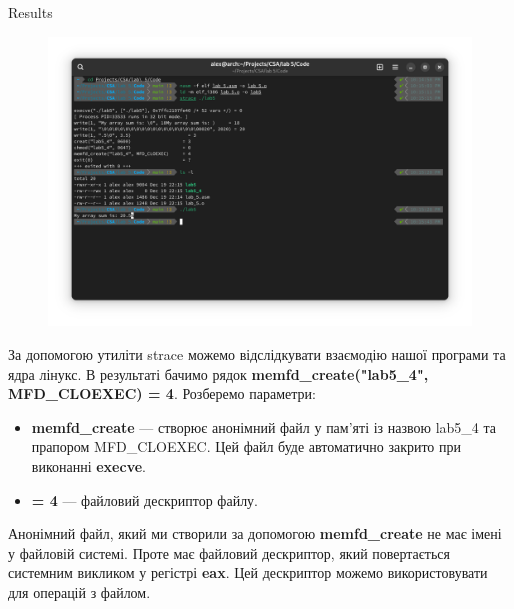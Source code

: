 \documentclass[a4paper,12pt]{article}
\begin{document}
    \begin{center}
        \Large{Results}
    \end{center}
    \begin{figure}[h!]
        \begin{minipage}[h]{1\linewidth}
            \centering
            \includegraphics[width=1\linewidth]{Prt sc/figure_1.png}  
        \end{minipage}
    \end{figure}
    За допомогою утиліти strace можемо відслідкувати взаємодію нашої програми та ядра лінукс.
    В результаті бачимо рядок \textbf{memfd\_create("lab5\_4", MFD\_CLOEXEC) = 4}. Розберемо параметри:
    \begin{itemize}
        \item \textbf{memfd\_create} — створює анонімний файл у пам'яті із назвою lab5\_4 та прапором MFD\_CLOEXEC.
        Цей файл буде автоматично закрито при виконанні \textbf{execve}.
        \item \textbf{= 4} — файловий дескриптор файлу.
    \end{itemize}
    Анонімний файл, який ми створили за допомогою \textbf{memfd\_create} не має імені у файловій системі.
    Проте має файловий дескриптор, який повертається системним викликом у регістрі \textbf{eax}. 
    Цей дескриптор можемо використовувати для операцій з файлом.
\end{document}
